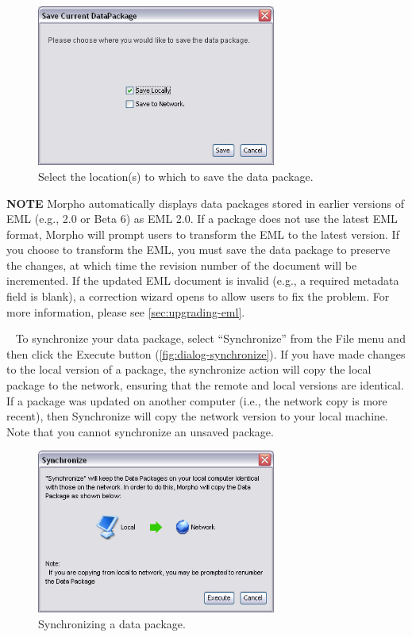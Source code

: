 \begin{figure}
  \centering
    \includegraphics[width=0.7\textwidth]{images/dialog-save-dp.png}
  \caption{Select the location(s) to which to save the data package.}
  \label{fig:dialog-save-dp}
\end{figure}

\begin{shaded}
  \textbf{NOTE} Morpho automatically displays data packages stored in
  earlier versions of EML (e.g., 2.0 or Beta 6) as EML 2.0. If a package
  does not use the latest EML format, Morpho will prompt users to
  transform the EML to the latest version. If you choose to transform
  the EML, you must save the data package to preserve the changes, at
  which time the revision number of the document will be incremented. If
  the updated EML document is invalid (e.g., a required metadata field
  is blank), a correction wizard opens to allow users to fix the
  problem. For more information, please see \autoref{sec:upgrading-eml}.
\end{shaded}
 
To synchronize your data package, select ``Synchronize'' from the File
menu and then click the Execute button
(\autoref{fig:dialog-synchronize}). If you have made changes to the
local version of a package, the synchronize action will copy the local
package to the network, ensuring that the remote and local versions are
identical. If a package was updated on another computer (i.e., the
network copy is more recent), then Synchronize will copy the network
version to your local machine. Note that you cannot synchronize an
unsaved package.

\begin{figure}
  \centering
    \includegraphics[width=0.7\textwidth]{images/dialog-synchronize.png}
  \caption{Synchronizing a data package.}
  \label{fig:dialog-synchronize}
\end{figure}

